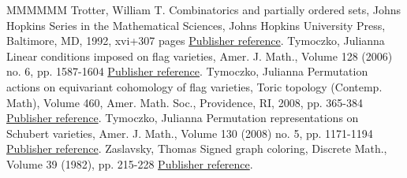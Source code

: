\begin{thebibliography}{MMMMMM}
 Trotter, William T. Combinatorics and partially ordered sets, Johns Hopkins Series in the Mathematical Sciences, Johns Hopkins University Press, Baltimore, MD, 1992, xvi+307 pages \href{https://alco.centre-mersenne.org/articles/10.5802/alco.459/#Trott}{Publisher reference}.
 Tymoczko, Julianna Linear conditions imposed on flag varieties, Amer. J. Math., Volume 128 (2006) no. 6, pp. 1587-1604 \href{https://alco.centre-mersenne.org/articles/10.5802/alco.459/#Ty1}{Publisher reference}.
 Tymoczko, Julianna Permutation actions on equivariant cohomology of flag varieties, Toric topology (Contemp. Math), Volume 460, Amer. Math. Soc., Providence, RI, 2008, pp. 365-384 \href{https://alco.centre-mersenne.org/articles/10.5802/alco.459/#Ty3}{Publisher reference}.
 Tymoczko, Julianna Permutation representations on Schubert varieties, Amer. J. Math., Volume 130 (2008) no. 5, pp. 1171-1194 \href{https://alco.centre-mersenne.org/articles/10.5802/alco.459/#Ty2}{Publisher reference}.
 Zaslavsky, Thomas Signed graph coloring, Discrete Math., Volume 39 (1982), pp. 215-228 \href{https://alco.centre-mersenne.org/articles/10.5802/alco.459/#ZaslavskySGC}{Publisher reference}.
\end{thebibliography}
